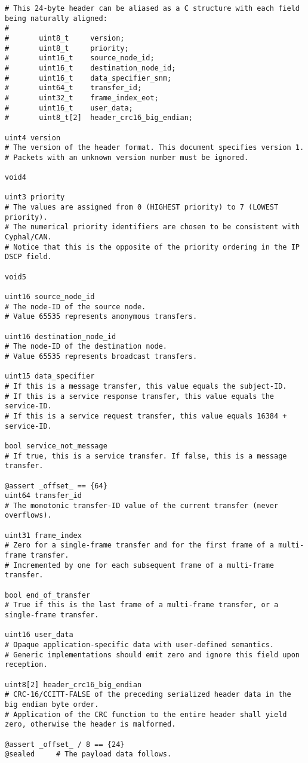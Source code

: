 \begin{samepage}
\begin{verbatim}
# This 24-byte header can be aliased as a C structure with each field being naturally aligned:
#
#       uint8_t     version;
#       uint8_t     priority;
#       uint16_t    source_node_id;
#       uint16_t    destination_node_id;
#       uint16_t    data_specifier_snm;
#       uint64_t    transfer_id;
#       uint32_t    frame_index_eot;
#       uint16_t    user_data;
#       uint8_t[2]  header_crc16_big_endian;

uint4 version
# The version of the header format. This document specifies version 1.
# Packets with an unknown version number must be ignored.

void4

uint3 priority
# The values are assigned from 0 (HIGHEST priority) to 7 (LOWEST priority).
# The numerical priority identifiers are chosen to be consistent with Cyphal/CAN.
# Notice that this is the opposite of the priority ordering in the IP DSCP field.

void5

uint16 source_node_id
# The node-ID of the source node.
# Value 65535 represents anonymous transfers.

uint16 destination_node_id
# The node-ID of the destination node.
# Value 65535 represents broadcast transfers.

uint15 data_specifier
# If this is a message transfer, this value equals the subject-ID.
# If this is a service response transfer, this value equals the service-ID.
# If this is a service request transfer, this value equals 16384 + service-ID.

bool service_not_message
# If true, this is a service transfer. If false, this is a message transfer.

@assert _offset_ == {64}
uint64 transfer_id
# The monotonic transfer-ID value of the current transfer (never overflows).

uint31 frame_index
# Zero for a single-frame transfer and for the first frame of a multi-frame transfer.
# Incremented by one for each subsequent frame of a multi-frame transfer.

bool end_of_transfer
# True if this is the last frame of a multi-frame transfer, or a single-frame transfer.

uint16 user_data
# Opaque application-specific data with user-defined semantics.
# Generic implementations should emit zero and ignore this field upon reception.

uint8[2] header_crc16_big_endian
# CRC-16/CCITT-FALSE of the preceding serialized header data in the big endian byte order.
# Application of the CRC function to the entire header shall yield zero, otherwise the header is malformed.

@assert _offset_ / 8 == {24}
@sealed     # The payload data follows.
\end{verbatim}
\end{samepage}

